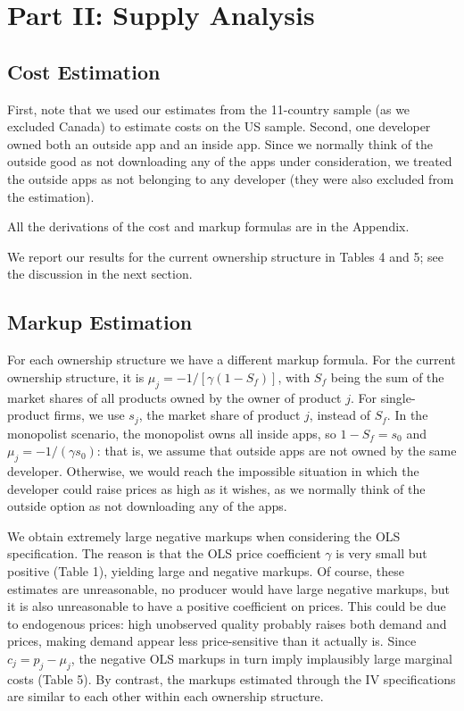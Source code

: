 \documentclass{article}
\begin{document}
\section{Part II: Supply Analysis}

\subsection{Cost Estimation}

First, note that we used our estimates from the 11-country sample (as we excluded Canada) to estimate costs on the US sample. Second, one developer owned both an outside app and an inside app. Since we normally think of the outside good as not downloading any of the apps under consideration, we treated the outside apps as not belonging to any developer (they were also excluded from the estimation).

All the derivations of the cost and markup formulas are in the Appendix.

We report our results for the current ownership structure in Tables 4 and 5; see the discussion in the next section.

\subsection{Markup Estimation}



For each ownership structure we have a different markup formula. For the current ownership structure, it is $\mu_j=-1/[\gamma(1-S_f)]$, with $S_f$ being the sum of the market shares of all products owned by the owner of product $j$. For single-product firms, we use $s_j$, the market share of product $j$, instead of $S_f$. In the monopolist scenario, the monopolist owns all inside apps, so $1-S_f=s_0$ and $\mu_j=-1/(\gamma s_0)$: that is, we assume that outside apps are not owned by the same developer. Otherwise, we would reach the impossible situation in which the developer could raise prices as high as it wishes, as we normally think of the outside option as not downloading any of the apps.

We obtain extremely large negative markups when considering the OLS specification. The reason is that the OLS price coefficient $\gamma$ is very small but positive (Table 1), yielding large and negative markups. Of course, these estimates are unreasonable, no producer would have large negative markups, but it is also unreasonable to have a positive coefficient on prices.  This could be due to endogenous prices: high unobserved quality probably raises both demand and prices, making demand appear less price-sensitive than it actually is. Since $c_j=p_j-\mu_j$, the negative OLS markups in turn imply implausibly large marginal costs (Table 5). By contrast, the markups estimated through the IV specifications are similar to each other within each ownership structure.

\end{document}
